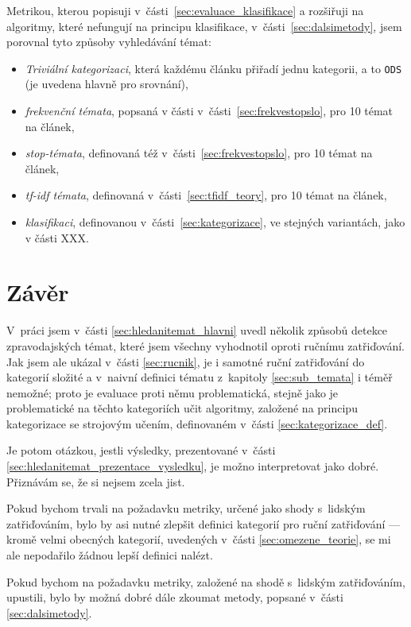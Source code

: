 \documentclass[12pt,a4paper]{report}
\def\chapwithtoc#1{
\chapter*{#1}
\addcontentsline{toc}{chapter}{#1}
}
\begin{document}
Metrikou, kterou popisuji v~části~\ref{sec:evaluace_klasifikace} a rozšiřuji na algoritmy, které nefungují na principu klasifikace, v~části~\ref{sec:dalsimetody}, jsem porovnal tyto způsoby vyhledávání témat:

\begin{itemize}
    \item \emph{Triviální kategorizaci}, která každému článku přiřadí jednu kategorii, a to \texttt{ODS} (je uvedena hlavně pro srovnání),
    \item \emph{frekvenční témata}, popsaná v části v~části~\ref{sec:frekvestopslo}, pro 10 témat na článek,
    \item \emph{stop-témata}, definovaná též v~části~\ref{sec:frekvestopslo}, pro 10 témat na článek,
    \item \emph{tf-idf témata}, definovaná v~části~\ref{sec:tfidf_teory}, pro 10 témat na článek,
    \item \emph{klasifikaci}, definovanou v~části~\ref{sec:kategorizace}, ve stejných variantách, jako v části XXX.
\end{itemize}



\chapwithtoc{Závěr}




V~práci jsem v~části \ref{sec:hledanitemat_hlavni} uvedl několik způsobů detekce zpravodajských témat, které jsem všechny vyhodnotil oproti ručnímu zatřiďování. Jak jsem ale ukázal v~části \ref{sec:rucnik}, je i samotné ruční zatřiďování do kategorií složité a v~naivní definici tématu z~kapitoly \ref{sec:sub_temata} i téměř nemožné; proto je evaluace proti němu problematická, stejně jako je problematické na těchto kategoriích učit algoritmy, založené na principu kategorizace se strojovým učením, definovaném v~části \ref{sec:kategorizace_def}.

Je potom otázkou, jestli výsledky, prezentované v~části \ref{sec:hledanitemat_prezentace_vysledku}, je možno interpretovat jako dobré. Přiznávám se, že si nejsem zcela jist.

Pokud bychom trvali na požadavku metriky, určené jako shody s~lidským zatřiďováním, bylo by asi nutné zlepšit definici kategorií pro ruční zatřiďování --- kromě velmi obecných kategorií, uvedených v~části \ref{sec:omezene_teorie}, se mi ale nepodařilo žádnou lepší definici nalézt. 

Pokud bychom na požadavku metriky, za\-lo\-že\-né na shodě s~lid\-ským za\-třiď\-o\-vá\-ním, upustili, bylo by možná dobré dále zkoumat metody, popsané v~části \ref{sec:dalsimetody}.
\end{document}
